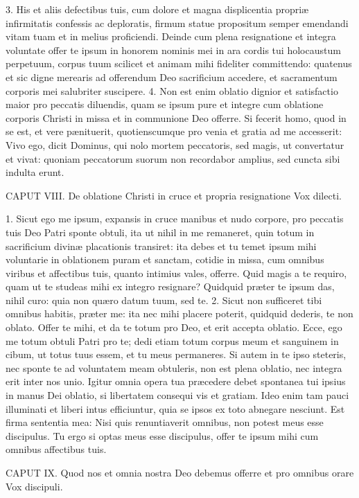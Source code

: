 3. His et aliis defectibus tuis, cum dolore et magna displicentia propriæ infirmitatis confessis ac deploratis, firmum statue propositum semper emendandi vitam tuam et in melius proficiendi. Deinde cum plena resignatione et integra voluntate offer te ipsum in honorem nominis mei in ara cordis tui holocaustum perpetuum, corpus tuum scilicet et animam mihi fideliter committendo: quatenus et sic digne merearis ad offerendum Deo sacrificium accedere, et sacramentum corporis mei salubriter suscipere.
4. Non est enim oblatio dignior et satisfactio maior pro peccatis diluendis, quam se ipsum pure et integre cum oblatione corporis Christi in missa et in communione Deo offerre. Si fecerit homo, quod in se est, et vere pænituerit, quotienscumque pro venia et gratia ad me accesserit: Vivo ego, dicit Dominus, qui nolo mortem peccatoris, sed magis, ut convertatur et vivat: quoniam peccatorum suorum non recordabor amplius, sed cuncta sibi indulta erunt.


CAPUT VIII.
De oblatione Christi in cruce et propria resignatione
Vox dilecti.

1. Sicut ego me ipsum, expansis in cruce manibus et nudo corpore, pro peccatis tuis Deo Patri sponte obtuli, ita ut nihil in me remaneret, quin totum in sacrificium divinæ placationis transiret: ita debes et tu temet ipsum mihi voluntarie in oblationem puram et sanctam, cotidie in missa, cum omnibus viribus et affectibus tuis, quanto intimius vales, offerre. Quid magis a te requiro, quam ut te studeas mihi ex integro resignare? Quidquid præter te ipsum das, nihil curo: quia non quæro datum tuum, sed te.
2. Sicut non sufficeret tibi omnibus habitis, præter me: ita nec mihi placere poterit, quidquid dederis, te non oblato. Offer te mihi, et da te totum pro Deo, et erit accepta oblatio. Ecce, ego me totum obtuli Patri pro te; dedi etiam totum corpus meum et sanguinem in cibum, ut totus tuus essem, et tu meus permaneres. Si autem in te ipso steteris, nec sponte te ad voluntatem meam obtuleris, non est plena oblatio, nec integra erit inter nos unio. Igitur omnia opera tua præcedere debet spontanea tui ipsius in manus Dei oblatio, si libertatem consequi vis et gratiam. Ideo enim tam pauci illuminati et liberi intus efficiuntur, quia se ipsos ex toto abnegare nesciunt. Est firma sententia mea: Nisi quis renuntiaverit omnibus, non potest meus esse discipulus. Tu ergo si optas meus esse discipulus, offer te ipsum mihi cum omnibus affectibus tuis.


CAPUT IX.
Quod nos et omnia nostra Deo debemus offerre et pro omnibus orare
Vox discipuli.

